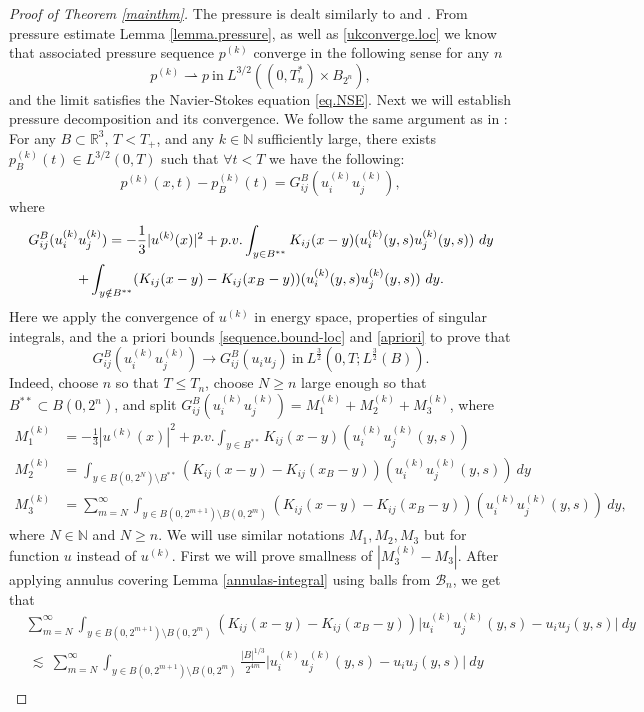 \documentclass[11pt]{article}
\numberwithin{equation}{section}
\theoremstyle{remark}
\theoremstyle{definition}
\newcommand{\cB}{\mathcal{B}}
\newcommand{\R}{\mathbb{R}}
\newcommand{\lec}{{\ \lesssim \ }}
\newcommand{\NN}{\mathbb{N}}
\newcommand{\EQ}[1]{\begin{equation} #1 \end{equation}}
\newcommand{\EQN}[1]{\begin{equation*}\begin{split} #1 \end{split}\end{equation*}}
\begin{document}
\begin{proof}[Proof of Theorem \ref{mainthm}]
The pressure is dealt similarly to \cite[Section 3]{KwTs} and \cite[Section 4]{BKT}. From pressure estimate Lemma \ref{lemma.pressure}, as well as \eqref{ukconverge.loc} we know that associated pressure sequence $p^{(k)}$ converge in the following sense for any $n$
\EQ{\label{pkconverge.loc}
p^{(k)}\rightharpoonup p~\textrm{in} ~L^{3/2}((0,T_n^*)\times B_{2^{n}}),
}
and the limit satisfies the Navier-Stokes equation \eqref{eq.NSE}. Next we will establish pressure decomposition and its convergence. We follow the same argument as in \cite{BKT}: For any $B\subset\R^3$, $T<T_+$, and any $k\in\NN$ sufficiently large, there exists $p^{(k)}_B(t)\in L^{3/2}(0,T)$ such that $\forall t<T$ we have the following:
\EQ{
p^{(k)}(x,t)-p^{(k)}_B(t)=G_{ij}^B(u_i^{(k)}u_j^{(k)}),
}
where
\EQ{\gathered
G_{ij}^B(u_i^{(k)}u_j^{(k)})=-\frac13|u^{(k)}(x)|^2+p.v.\int_{y\in B^{**}}K_{ij}(x-y)(u^{(k)}_i(y,s)u^{(k)}_j(y,s))~dy
\\
+\int_{y\notin B^{**}}(K_{ij}(x-y)-K_{ij}(x_B-y))(u^{(k)}_i(y,s)u^{(k)}_j(y,s))~dy.
\endgathered}
Here we apply the convergence of $u^{(k)}$ in energy space, properties of singular integrals, and the a priori bounds \eqref{sequence.bound-loc} and \eqref{apriori}
 to prove that
\EQ{\label{G.convergence}
G_{ij}^B(u_i^{(k)}u_j^{(k)})\rightarrow G^B_{ij}(u_iu_j) ~\textrm{in}~ L^{\frac{3}{2}}(0,T;L^{\frac{3}{2}}(B)).
}
Indeed, choose $n$ so  {that $T\le T_n$, choose $N \ge n$
large enough so that $B^{**}\subset B(0,2^n)$,} and split $G_{ij}^B(u_i^{(k)}u_j^{(k)})=M_1^{(k)}+M_2^{(k)}+M_3^{(k)}$, where
\EQN{
M_1^{(k)}&=-\frac13|u^{(k)}(x)|^2+p.v.\int_{y\in B^{**}}K_{ij}(x-y)(u^{(k)}_iu^{(k)}_j(y,s))
\\
M_2^{(k)}&=\int_{y\in B(0,2^N)\setminus B^{**}}(K_{ij}(x-y)-K_{ij}(x_B-y))(u^{(k)}_iu^{(k)}_j(y,s))~dy
\\
M_3^{(k)}&=\sum_{m=N}^{\infty} \int_{y\in B(0,2^{m+1})\setminus B(0,2^{m})}(K_{ij}(x-y)-K_{ij}(x_B-y))(u^{(k)}_iu^{(k)}_j(y,s))~dy,
} 
where $N\in \NN$ and $N\ge n$.
We will use similar notations $M_1,M_2,M_3$ but for function $u$ instead of $u^{(k)}$. First we will prove smallness of $|M_3^{(k)}-M_3|$. After applying annulus covering Lemma \ref{annulas-integral} using balls from $\cB_n$, we get that
\EQN{\label{5.10}
&\sum_{m=N}^{\infty} \int_{y\in B(0,2^{m+1})\setminus B(0,2^{m})}(K_{ij}(x-y)-K_{ij}(x_B-y))\big |u^{(k)}_iu^{(k)}_j(y,s)-u_iu_j(y,s)\big|~dy
\\
&\lec \sum_{m=N}^{\infty}\int_{y\in B(0,2^{m+1})\setminus B(0,2^{m})}\frac{|B|^{1/3}}{2^{4m}}\big|u^{(k)}_iu^{(k)}_j(y,s)-u_iu_j(y,s)\big|~dy
\\
}
\end{proof}
\end{document}
